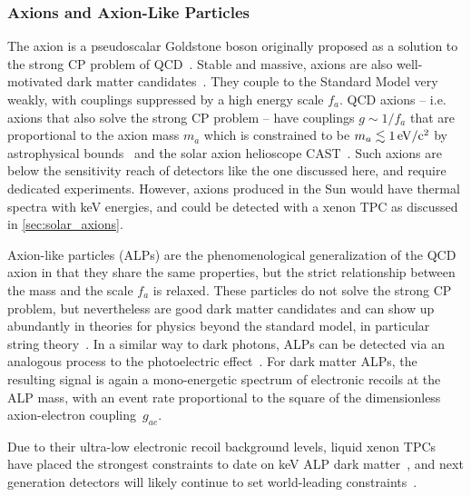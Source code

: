 \subsubsection{Axions and Axion-Like Particles}

The axion is a pseudoscalar Goldstone boson originally proposed as a solution to the strong CP problem of QCD~\cite{PecceiQuinn_1977,Weinberg:1977ma,Wilczek:1977pj}. Stable and massive, axions are also well-motivated dark matter candidates~\cite{Preskill:1982cy,Abbott:1982af,Dine:1982ah}. They couple to the Standard Model very weakly, with couplings suppressed by a high energy scale $f_a$. QCD axions -- i.e. axions that also solve the strong CP problem -- have couplings $g \sim 1/f_a$ that are proportional to the axion mass $m_a$ which is constrained to be $m_a \lesssim 1\, \mathrm{eV/c^2}$ by astrophysical bounds~\cite{Raffelt:2006cw,Sikivie:2006ni,Ayala:2014pea,Chang:2018rso,Capozzi:2020cbu} and the solar axion helioscope CAST~\cite{Anastassopoulos:2017ftl}. Such axions are below the sensitivity reach of detectors like the one discussed here, and require dedicated experiments. However, axions produced in the Sun would have thermal spectra with keV energies, and could be detected with a xenon TPC as discussed in \autoref{sec:solar_axions}.

Axion-like particles (ALPs) are the phenomenological generalization of the QCD axion in that they share the same properties, but the strict relationship between the mass and the scale $f_a$ is relaxed. These particles do not solve the strong CP problem, but nevertheless are good dark matter candidates and can show up abundantly in theories for physics beyond the standard model, in particular string theory~\cite{Witten:1983ar,Conlon:2006tq,Arvanitaki:2009fg,Arvanitaki:2010sy,Cicoli:2012sz, Arvanitaki:2014wva}. In a similar way to dark photons, ALPs can be detected via an analogous process to the photoelectric effect~\cite{Derevianko:2010kz}. For dark matter ALPs, the resulting signal is again a mono-energetic spectrum of electronic recoils at the ALP mass, with an event rate proportional to the square of the dimensionless axion-electron coupling~$g_{ae}$. 

Due to their ultra-low electronic recoil background levels, liquid xenon TPCs have placed the strongest constraints to date on keV ALP dark matter~\cite{Aprile:2014eoa, Abe:2014zcd,Akerib:2017uem, Fu:2017lfc,Abe:2018owy,Aprile:2019xxb,Aprile:2020tmw,Zhou:2020bvf}, and next generation detectors will likely continue to set world-leading constraints~\cite{Aalbers:2016jon}.

